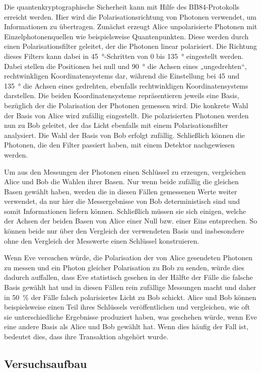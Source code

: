 Die quantenkryptographische Sicherheit kann mit Hilfe des BB84-Protokolls
erreicht werden. Hier wird die Polarisationsrichtung von Photonen verwendet, um
Informationen zu übertragen. Zunächst erzeugt Alice unpolarisierte Photonen mit
Einzelphotonenquellen wie beispielsweise Quantenpunkten. Diese werden durch
einen Polarisationsfilter geleitet, der die Photonen linear polarisiert. Die
Richtung dieses Filters kann dabei in \SI{45}{\degree}-Schritten von 0 bis
\SI{135}{\degree} eingestellt werden. Dabei stellen die Positionen bei null und
\SI{90}{\degree} die Achsen eines „ungedrehten“, rechtwinkligen
Koordinatensystems dar, während die Einstellung bei 45 und \SI{135}{\degree} die
Achsen eines gedrehten, ebenfalls rechtwinkligen Koordinatensystems darstellen.
Die beiden Koordinatensysteme repräsentieren jeweils eine Basis, bezüglich der
die Polarisation der Photonen gemessen wird. Die konkrete Wahl der Basis von
Alice wird zufällig eingestellt. Die polarisierten Photonen werden nun zu Bob
geleitet, der das Licht ebenfalls mit einem Polarisationsfilter analysiert. Die
Wahl der Basis von Bob erfolgt zufällig. Schließlich können die Photonen, die
den Filter passiert haben, mit einem Detektor nachgewiesen werden.

Um aus den Messungen der Photonen einen Schlüssel zu erzeugen, vergleichen
Alice und Bob die Wahlen ihrer Basen. Nur wenn beide zufällig die gleichen Basen
gewählt haben, werden die in diesen Fällen gemessenen Werte weiter verwendet, da
nur hier die Messergebnisse von Bob deterministisch sind und somit Informationen
liefern können. Schließlich müssen sie sich einigen, welche der Achsen der
beiden Basen von Alice einer Null bzw. einer Eins entsprechen. So können beide
nur über den Vergleich der verwendeten Basis und insbesondere ohne den
Vergleich der Messwerte einen Schlüssel konstruieren.

Wenn Eve versuchen würde, die Polarisation der von Alice gesendeten Photonen zu
messen und ein Photon gleicher Polarisation zu Bob zu senden, würde dies
dadurch auffallen, dass Eve statistisch gesehen in der Hälfte der Fälle die
falsche Basis gewählt hat und in diesen Fällen rein zufällige Messungen macht
und daher in \SI{50}{\percent} der Fälle falsch polarisiertes Licht zu Bob
schickt. Alice und Bob können beispielsweise einen Teil ihres Schlüssels
veröffentlichen und vergleichen, wie oft sie unterschiedliche Ergebnisse
produziert haben, was geschehen würde, wenn Eve eine andere Basis als Alice und
Bob gewählt hat. Wenn dies häufig der Fall ist, bedeutet dies, dass ihre
Transaktion abgehört wurde. 

\subsection{Versuchsaufbau}